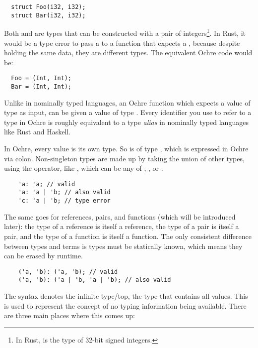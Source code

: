 \documentclass[12pt,twoside]{report}
\begin{document}
\begin{verbatim}
  struct Foo(i32, i32);
  struct Bar(i32, i32);
\end{verbatim}

\noindent
Both  and  are types that can be constructed with a pair of integers\footnote{In Rust,  is the type of 32-bit signed integers.}. In Rust, it would be a type error to pass a  to a function that expects a , because despite holding the same data, they are different types. The equivalent Ochre code would be:

\begin{verbatim}
  Foo = (Int, Int);
  Bar = (Int, Int);
\end{verbatim}

Unlike in nominally typed languages, an Ochre function which expects a value of type  as input, can be given a value of type . Every identifier you use to refer to a type in Ochre is roughly equivalent to a type \textit{alias} in nominally typed languages like Rust and Haskell.

In Ochre, every value is its own type. So  is of type , which is expressed in Ochre via colon. Non-singleton types are made up by taking the union of other types, using the \mono{|} operator, like , which can be any of , , or .

  \begin{verbatim}
    'a: 'a; // valid
    'a: 'a | 'b; // also valid
    'c: 'a | 'b; // type error
  \end{verbatim}

The same goes for references, pairs, and functions (which will be introduced later): the type of a reference is itself a reference, the type of a pair is itself a pair, and the type of a function is itself a function. The only consistent difference between types and terms is types must be statically known, which means they can be erased by runtime.

  \begin{verbatim}
    ('a, 'b): ('a, 'b); // valid
    ('a, 'b): ('a | 'b, 'a | 'b); // also valid
  \end{verbatim}

The \mono{*} syntax denotes the infinite type/top, the type that contains all values. This is used to represent the concept of no typing information being available. There are three main places where this comes up:
\end{document}
